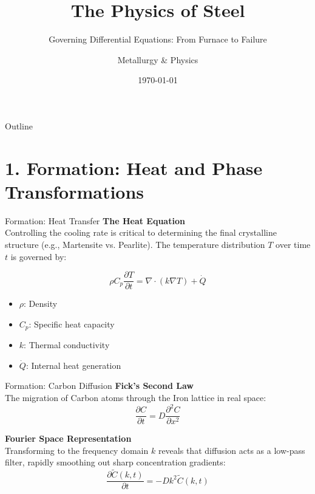 \documentclass{beamer}
\title{The Physics of Steel}
\subtitle{Governing Differential Equations: From Furnace to Failure}
\author{Metallurgy \& Physics}
\date{\today}
\begin{document}
\begin{frame}
    \titlepage
\end{frame}

\begin{frame}{Outline}
    \tableofcontents
\end{frame}

\section{1. Formation: Heat and Phase Transformations}

\begin{frame}{Formation: Heat Transfer}
    \textbf{The Heat Equation} \\
    Controlling the cooling rate is critical to determining the final crystalline structure (e.g., Martensite vs. Pearlite). The temperature distribution $T$ over time $t$ is governed by:

    $$\rho C_p \frac{\partial T}{\partial t} = \nabla \cdot (k \nabla T) + \dot{Q}$$

    \begin{itemize}
        \item $\rho$: Density
        \item $C_p$: Specific heat capacity
        \item $k$: Thermal conductivity
        \item $\dot{Q}$: Internal heat generation
    \end{itemize}
\end{frame}

\begin{frame}{Formation: Carbon Diffusion}
    \textbf{Fick's Second Law} \\
    The migration of Carbon atoms through the Iron lattice in real space:
    $$\frac{\partial C}{\partial t} = D \frac{\partial^2 C}{\partial x^2}$$

    \vspace{0.5cm}
    \textbf{Fourier Space Representation} \\
    Transforming to the frequency domain $k$ reveals that diffusion acts as a low-pass filter, rapidly smoothing out sharp concentration gradients:
    $$\frac{\partial \tilde{C}(k,t)}{\partial t} = -D k^2 \tilde{C}(k,t)$$
\end{frame}
\end{document}
